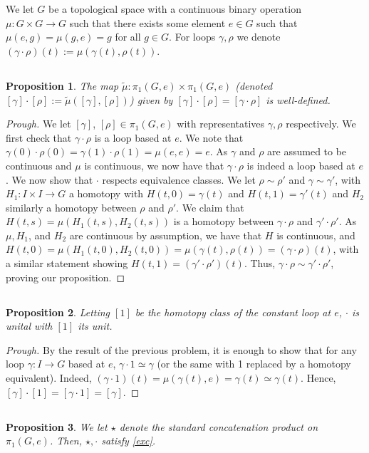 \documentclass[english]{article}
\newcommand{\prob}[1]{\setcounter{section}{#1-1}\section{}}
\newcommand{\prt}[1]{\setcounter{subsection}{#1-1}\subsection{}}
\newtheorem*{proposition*}{Proposition}
\theoremstyle{remark}
\theoremstyle{definition}
\begin{document}
\prob{3} We let $G$ be a topological space with a continuous binary operation $\mu:G\times G\to G$ such that there exists some element $e\in G$ such that $\mu(e,g)=\mu(g,e)=g$ for all $g\in G$. For loops $\gamma,\rho$ we denote $(\gamma\cdot\rho)(t):=\mu(\gamma(t),\rho(t))$.
\prt{1}\begin{proposition*}
The map $\tilde{\mu}:\pi_1(G,e)\times \pi_1(G,e)$ (denoted $[\gamma]\cdot[\rho]:=\tilde\mu([\gamma],[\rho])$) given by $[\gamma]\cdot[\rho]=[\gamma\cdot\rho]$ is well-defined.
\end{proposition*}
\begin{proof}[Prough]
	We let $[\gamma]$, $[\rho]\in \pi_1(G,e)$ with representatives $\gamma,\rho$ respectively. We first check that $\gamma\cdot\rho$ is a loop based at $e$. We note that $\gamma(0)\cdot\rho(0)=\gamma(1)\cdot \rho(1)=\mu(e,e)=e$. As $\gamma$ and $\rho$ are assumed to be continuous and $\mu$ is continuous, we now have that $\gamma\cdot\rho$ is indeed a loop based at $e$. We now show that $\cdot$ respects equivalence classes. We let $\rho \sim \rho'$ and $\gamma\sim \gamma'$, with $H_1: I\times I\to G$ a homotopy with $H(t,0)=\gamma(t)$ and $H(t,1)=\gamma'(t)$ and $H_2$ similarly a homotopy between $\rho$ and $\rho'$. We claim that $H(t,s)=\mu(H_1(t,s),H_2(t,s))$ is a homotopy between $\gamma\cdot\rho$ and $\gamma'\cdot \rho'$. As $\mu, H_1$, and $H_2$ are continuous by assumption, we have that $H$ is continuous, and $H(t,0)=\mu(H_1(t,0),H_2(t,0))=\mu(\gamma(t),\rho(t))=(\gamma\cdot \rho)(t)$, with a similar statement showing $H(t,1)=(\gamma'\cdot \rho')(t)$. Thus, $\gamma\cdot \rho\sim \gamma'\cdot \rho'$, proving our proposition.
\end{proof}
\prt{2}
\begin{proposition*}
	Letting $[1]$ be the homotopy class of the constant loop at $e$, $\cdot$ is unital with $[1]$ its unit.
\end{proposition*}
\begin{proof}[Prough]
	By the result of the previous problem, it is enough to show that for any loop $\gamma:I\to G$ based at $e$, $\gamma\cdot 1\simeq \gamma$ (or the same with 1 replaced by a homotopy equivalent). Indeed, $(\gamma\cdot1)(t)=\mu(\gamma(t),e)=\gamma(t)\simeq \gamma(t)$. Hence, $[\gamma]\cdot [1]=[\gamma\cdot1]=[\gamma]$. 
\end{proof}
\prt{3}
\begin{proposition*}
We let $\star$ denote the standard concatenation product on $\pi_1(G,e)$. Then, $\star,\cdot$ satisfy \eqref{exc}.
\end{proposition*}
\end{document}
